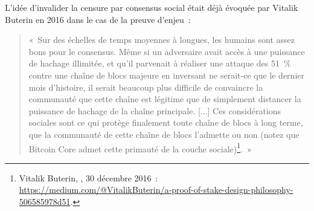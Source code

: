 L'idée d'invalider la censure par consensus social était déjà évoquée par Vitalik Buterin en 2016 dans le cas de la preuve d'enjeu~:

\begin{quote}
«~Sur des échelles de temps moyennes à longues, les humains sont assez bons pour le consensus. Même si un adversaire avait accès à une puissance de hachage illimitée, et qu'il parvenait à réaliser une attaque des 51~\% contre une chaîne de blocs majeure en inversant ne serait-ce que le dernier mois d'histoire, il serait beaucoup plus difficile de convaincre la communauté que cette chaîne est légitime que de simplement distancer la puissance de hachage de la chaîne principale. [...] Ces considérations sociales sont ce qui protège finalement toute chaîne de blocs à long terme, que la communauté de cette chaîne de blocs l'admette ou non (notez que Bitcoin Core admet cette primauté de la couche sociale)\footnote{Vitalik Buterin, , 30 décembre 2016~: \url{https://medium.com/@VitalikButerin/a-proof-of-stake-design-philosophy-506585978d51}.}.~»
\end{quote}

%

